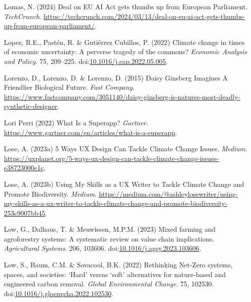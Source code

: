 \documentclass[
  letterpaper,
  DIV=11,
  numbers=noendperiod]{scrartcl}
\newlength{\cslhangindent}
\newenvironment{CSLReferences}[2] %
 {\begin{list}{}{%
  \setlength{\itemindent}{0pt}
  \setlength{\leftmargin}{0pt}
  \setlength{\parsep}{0pt}
  \ifodd #1
   \setlength{\leftmargin}{\cslhangindent}
   \setlength{\itemindent}{-1\cslhangindent}
  \fi
  \setlength{\itemsep}{#2\baselineskip}}}
 {\end{list}}
\begin{document}
\begin{CSLReferences}{0}{1}
Lomas, N. (2024) Deal on {EU AI Act} gets thumbs up from {European
Parliament}. \emph{TechCrunch}.
\url{https://techcrunch.com/2024/03/13/deal-on-eu-ai-act-gets-thumbs-up-from-european-parliament/}.

Lopez, R.E., Pastén, R. \& Gutiérrez Cubillos, P. (2022) Climate change
in times of economic uncertainty: {A} perverse tragedy of the commons?
\emph{Economic Analysis and Policy}. 75, 209--225.
doi:\href{https://doi.org/10.1016/j.eap.2022.05.005}{10.1016/j.eap.2022.05.005}.

Lorenzo, D., Lorenzo, D. \& Lorenzo, D. (2015) Daisy {Ginsberg Imagines
A Friendlier Biological Future}. \emph{Fast Company}.
\url{https://www.fastcompany.com/3051140/daisy-ginsberg-is-natures-most-deadly-synthetic-designer}.

Lori Perri (2022) What {Is} a {Superapp}? \emph{Gartner}.
\url{https://www.gartner.com/en/articles/what-is-a-superapp}.

Lose, A. (2023a) 5 {Ways UX Design Can Tackle Climate Change Issues}.
\emph{Medium}.
\url{https://uxplanet.org/5-ways-ux-design-can-tackle-climate-change-issues-e38723000e1c}.

Lose, A. (2023b) Using {My Skills} as a {UX Writer} to {Tackle Climate
Change} and {Promote Biodiversity}. \emph{Medium}.
\url{https://medium.com/@ashleylosewriter/using-my-skills-as-a-ux-writer-to-tackle-climate-change-and-promote-biodiversity-253c9007bb45}.

Low, G., Dalhaus, T. \& Meuwissen, M.P.M. (2023) Mixed farming and
agroforestry systems: {A} systematic review on value chain implications.
\emph{Agricultural Systems}. 206, 103606.
doi:\href{https://doi.org/10.1016/j.agsy.2023.103606}{10.1016/j.agsy.2023.103606}.

Low, S., Baum, C.M. \& Sovacool, B.K. (2022) Rethinking {Net-Zero}
systems, spaces, and societies: {`{Hard}'} versus {`soft'} alternatives
for nature-based and engineered carbon removal. \emph{Global
Environmental Change}. 75, 102530.
doi:\href{https://doi.org/10.1016/j.gloenvcha.2022.102530}{10.1016/j.gloenvcha.2022.102530}.


\end{CSLReferences}
\end{document}

